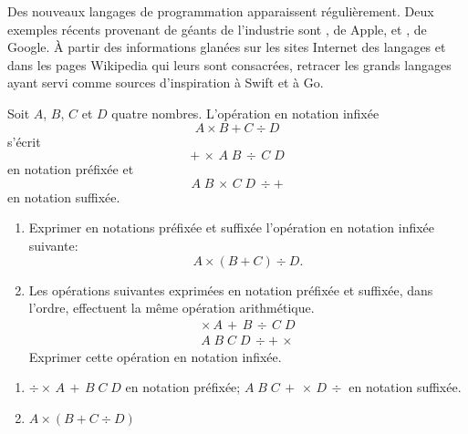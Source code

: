 \begin{exercice}[nosol]
  Des nouveaux langages de programmation apparaissent régulièrement.
  Deux exemples récents provenant de géants de l'industrie sont
  , de Apple, et
  , de Google. À partir des informations
  glanées sur les sites Internet des langages et dans les pages
  Wikipedia qui leurs sont consacrées, retracer les grands langages
  ayant servi comme sources d'inspiration à Swift et à
  Go.
\end{exercice}

\begin{exercice}
  Soit $A$, $B$, $C$ et $D$ quatre nombres. L'opération en notation
  infixée
  \begin{equation*}
    A \times B + C \div D
  \end{equation*}
  s'écrit
  \begin{equation*}
    +\, \times\, A\; B\, \div\, C\; D
  \end{equation*}
  en notation préfixée et
  \begin{equation*}
    A\; B\, \times\, C\; D\, \div +
  \end{equation*}
  en notation suffixée.
  \begin{enumerate}
  \item Exprimer en notations préfixée et suffixée l'opération en
    notation infixée suivante:
    \begin{equation*}
      A \times (B + C) \div D.
    \end{equation*}
  \item Les opérations suivantes exprimées en notation préfixée et
    suffixée, dans l'ordre, effectuent la même opération arithmétique.
    \begin{gather*}
      \times\, A\, +\, B\, \div\, C\; D \\
      A\; B\; C\; D\, \div +\, \times
    \end{gather*}
    Exprimer cette opération en notation infixée.
  \end{enumerate}
  \begin{sol}
    \begin{enumerate}
    \item $\div \times\, A\, +\, B\; C\; D$ en notation préfixée;
      $A\; B\; C\, +\, \times\, D\, \div$ en notation suffixée.
    \item $A \times (B + C \div D)$
    \end{enumerate}
  \end{sol}
\end{exercice}

